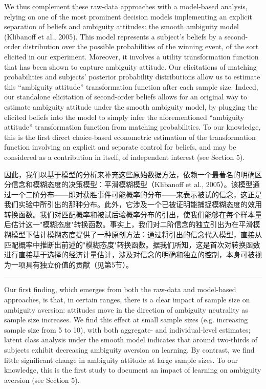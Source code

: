 \documentclass[12pt,a4paper]{article}
\newenvironment{original}
  {\par\vspace{0.5em}\noindent\color{black}\ignorespaces}
  {\par\vspace{0.3em}}
\newenvironment{translation}
  {\par\noindent\color{transblue}\ignorespaces}
  {\par\vspace{0.8em}\hrule\vspace{0.5em}}
\begin{document}
\begin{original}
We thus complement these raw-data approaches with a model-based analysis, relying on one of the most prominent decision models implementing an explicit separation of beliefs and ambiguity attitudes: the smooth ambiguity model (Klibanoff et al., 2005). This model represents a subject's beliefs by a second-order distribution over the possible probabilities of the winning event, of the sort elicited in our experiment. Moreover, it involves a utility transformation function that has been shown to capture ambiguity attitude. Our elicitations of matching probabilities and subjects' posterior probability distributions allow us to estimate this ``ambiguity attitude'' transformation function after each sample size. Indeed, our standalone elicitation of second-order beliefs allows for an original way to estimate ambiguity attitude under the smooth ambiguity model, by plugging the elicited beliefs into the model to simply infer the aforementioned ``ambiguity attitude'' transformation function from matching probabilities. To our knowledge, this is the first direct choice-based econometric estimation of the transformation function involving an explicit and separate control for beliefs, and may be considered as a contribution in itself, of independent interest (see Section 5).
\end{original}

\begin{translation}
因此，我们以基于模型的分析来补充这些原始数据方法，依赖一个最著名的明确区分信念和模糊态度的决策模型：平滑模糊模型（Klibanoff et al., 2005）。该模型通过一个二阶分布——即对获胜事件可能概率的分布——来表示被试的信念，这正是我们实验中所引出的那种分布。此外，它涉及一个已被证明能捕捉模糊态度的效用转换函数。我们对匹配概率和被试后验概率分布的引出，使我们能够在每个样本量后估计这一"模糊态度"转换函数。事实上，我们对二阶信念的独立引出为在平滑模糊模型下估计模糊态度提供了一种原创方法：通过将引出的信念代入模型，直接从匹配概率中推断出前述的"模糊态度"转换函数。据我们所知，这是首次对转换函数进行直接基于选择的经济计量估计，涉及对信念的明确和独立的控制，本身可被视为一项具有独立价值的贡献（见第5节）。
\end{translation}

\begin{original}
Our first finding, which emerges from both the raw-data and model-based approaches, is that, in certain ranges, there is a clear impact of sample size on ambiguity aversion: attitudes move in the direction of ambiguity neutrality as sample size increases. We find this effect at small sample sizes (e.g. increasing sample size from 5 to 10), with both aggregate- and individual-level estimates; latent class analysis under the smooth model indicates that around two-thirds of subjects exhibit decreasing ambiguity aversion on learning. By contrast, we find little significant change in ambiguity attitude at large sample sizes. To our knowledge, this is the first study to document an impact of learning on ambiguity aversion (see Section 5).
\end{original}
\end{document}
